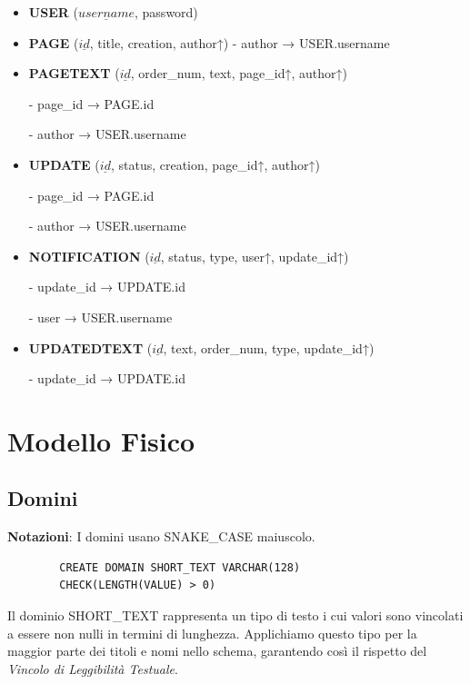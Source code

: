 \documentclass{article}
\begin{document}
	\begin{itemize}
		\item \textbf{USER} ($\underline{username}$, password)
		
		\item \textbf{PAGE} ($\underline{id}$, title, creation, author↑)
		- author → USER.username
		
		\item \textbf{PAGETEXT} ($\underline{id}$, order\_num, text, page\_id↑, author↑)
		
		- page\_id → PAGE.id
		
		- author → USER.username
		
		\item \textbf{UPDATE} ($\underline{id}$, status, creation, page\_id↑, author↑)
		
		- page\_id → PAGE.id
		
		- author → USER.username
		
		\item \textbf{NOTIFICATION} ($\underline{id}$, status, type, user↑, update\_id↑)
		
		- update\_id → UPDATE.id
		
		- user → USER.username
		
		\item \textbf{UPDATEDTEXT} ($\underline{id}$, text, order\_num, type, update\_id↑)
		
		- update\_id → UPDATE.id
	\end{itemize}
	
	
	\newpage
	
	\section{Modello Fisico}
	\subsection{Domini}
	\textbf{Notazioni}: I domini usano SNAKE\_CASE maiuscolo.
		
	\begin{lstlisting}
		CREATE DOMAIN SHORT_TEXT VARCHAR(128)
		CHECK(LENGTH(VALUE) > 0)
	\end{lstlisting}
	
	Il dominio SHORT\_TEXT rappresenta un tipo di testo i cui valori sono vincolati
	a essere non nulli in termini di lunghezza. Applichiamo questo tipo per la maggior parte
	dei titoli e nomi nello schema, garantendo così il rispetto del {\itshape{Vincolo di Leggibilit\`a Testuale}}.
	
\end{document}
